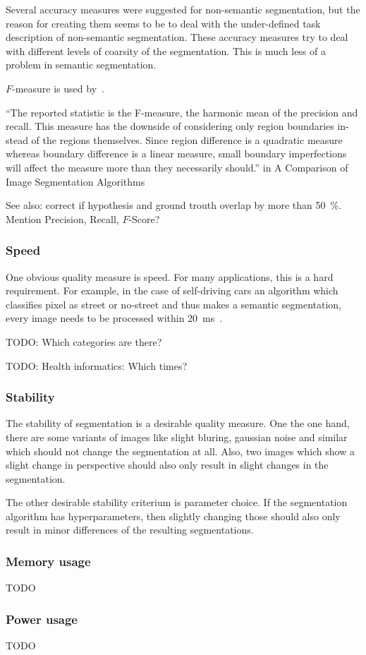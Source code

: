 Several accuracy measures were suggested for non-semantic
segmentation,\cite{martin2001database} but the reason for creating them seems
to be to deal with the under-defined task description of non-semantic
segmentation. These accuracy measures try to deal with different levels of
coarsity of the segmentation. This is much less of a problem in semantic
segmentation.

$F$-measure is used by~\cite{cohen2015memory}.

\enquote{The reported statistic is the F-measure, the harmonic mean of the precision
and recall. This measure has the downside of considering only region boundaries
in- stead of the regions themselves. Since region difference is a quadratic
measure whereas boundary difference is a linear measure, small boundary
imperfections will affect the measure more than they necessarily should.} in
A Comparison of Image Segmentation Algorithms

See also: \cite{yang2012layered,tighe2014scene} correct if hypothesis and
ground trouth overlap by more than \SI{50}{\percent}.
Mention Precision, Recall, $F$-Score?


\subsubsection{Speed}\label{subsubsec:speed-quality-measure}
One obvious quality measure is speed. For many applications, this is a hard
requirement. For example, in the case of self-driving cars an algorithm which
classifies pixel as street or no-street and thus makes a semantic segmentation,
every image needs to be processed within
\SI{20}{\milli\second}~\cite{bittel2015pixel}.

TODO: Which categories are there?

TODO: Health informatics: Which times?


\subsubsection{Stability}\label{subsubsec:stability-quality-measure}
The stability of segmentation is a desirable quality measure. One the one hand,
there are some variants of images like slight bluring, gaussian noise and
similar which should not change the segmentation at all. Also, two images which
show a slight change in perspective should also only result in slight changes
in the segmentation.\cite{pantofaru2005comparison}

The other desirable stability criterium is parameter choice. If the
segmentation algorithm has hyperparameters, then slightly changing those should
also only result in minor differences of the resulting segmentations.\cite{pantofaru2005comparison}

\subsubsection{Memory usage}

TODO

\subsubsection{Power usage}

TODO
